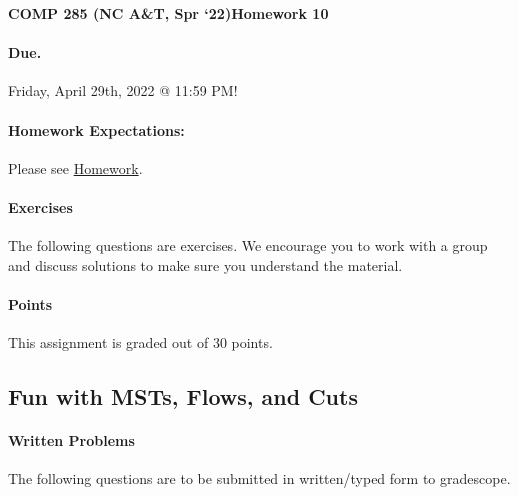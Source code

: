 \documentclass [12pt]{article}
\begin{document}
 

{\LARGE \textbf{COMP 285 (NC A\&T, Spr `22)}\hfill \textbf{Homework 10} } 
\vspace{1em} 
\begin{Instruction} 

\paragraph{Due.} Friday, April 29th, 2022 @ 11:59 PM!
\end{Instruction}

\vspace{1em} 
\begin{Instruction} \paragraph{Homework Expectations:} Please see \href{https://www.comp285-fall22.ml/homework/#general-homework-information}{Homework}.
\end{Instruction}

\vspace{1em} 
\begin{Instruction} 

\paragraph{Exercises} The following questions are exercises. We encourage you to work with a group and discuss solutions to make sure you understand the material.

\paragraph{Points} This assignment is graded out of 30 points.

\end{Instruction} 

\begin{centering}
\section*{Fun with MSTs, Flows, and Cuts}
\end{centering}

\begin{Instruction}

\paragraph{Written Problems} The following questions are to be submitted in written/typed form to gradescope.

\end{Instruction}
\end{document}
